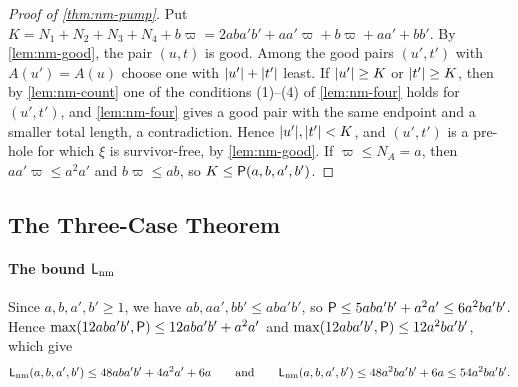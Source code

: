 \begin{proof}[Proof of \cref{thm:nm-pump}]
Put $K=N_1+N_2+N_3+N_4+b\varpi=2aba'b'+aa'\varpi+b\varpi+aa'+bb'$. By
\cref{lem:nm-good}, the pair $(u,t)$ is good. Among the good pairs $(u',t')$
with $A(u')=A(u)$ choose one with $\lvert u'\rvert+\lvert t'\rvert$ least. If
$\lvert u'\rvert\ge K$ or $\lvert t'\rvert\ge K$, then by \cref{lem:nm-count} one of the
conditions (1)--(4) of \cref{lem:nm-four} holds for $(u',t')$, and
\cref{lem:nm-four} gives a good pair with the same endpoint and a smaller total
length, a contradiction. Hence $\lvert u'\rvert,\lvert t'\rvert<K$, and $(u',t')$ is a
pre-hole for which $\xi$ is survivor-free, by \cref{lem:nm-good}. If
$\varpi\le N_A=a$, then $aa'\varpi\le a^2a'$ and $b\varpi\le ab$, so $K\le\mathsf P(a,b,a',b')$.
\end{proof}

\subsection{The Three-Case Theorem}\label{app:nm-three-cases}

\paragraph{The bound $\mathsf L_{\mathrm{nm}}$}
Since $a,b,a',b'\ge1$, we have $ab,aa',bb'\le aba'b'$, so
$\mathsf P\le5aba'b'+a^2a'\le6a^2ba'b'$. Hence
$\max(12aba'b',\mathsf P)\le12aba'b'+a^2a'$ and $\max(12aba'b',\mathsf P)\le12a^2ba'b'$,
which give
\[
 \mathsf L_{\mathrm{nm}}(a,b,a',b')\le48aba'b'+4a^2a'+6a\qquad\text{and}\qquad
 \mathsf L_{\mathrm{nm}}(a,b,a',b')\le48a^2ba'b'+6a\le54a^2ba'b' .
\]

